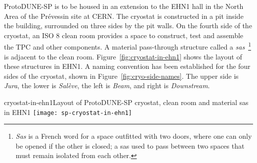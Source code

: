 
\label{ch:spacereq}

ProtoDUNE-SP is to be housed in an extension to the EHN1 hall in the North Area of the Pr\'{e}vessin site at CERN. 
The cryostat is constructed in a pit inside the building, surrounded on three sides by the pit walls.  On the fourth side of the cryostat, an ISO 8 clean room provides a space to construct, test and assemble the TPC and other components. 
A material pass-through structure called a \textit{sas}~\footnote{\textit{Sas} is a French word for a space outfitted with two doors, where one can only be opened if the other is closed; a sas used to pass between two spaces that must remain isolated from each other.} is adjacent to the clean room. Figure~\ref{fig:cryostat-in-ehn1} shows the layout of these structures in EHN1. A naming convention has been established for the four sides of the cryostat, shown in Figure~\ref{fig:cryo-side-names}.  The upper side is \textit{Jura}, the lower is \textit{Sal\`{e}ve}, the left is \textit{Beam}, and right is \textit{Downstream}.



\begin{cdrfigure}{cryostat-in-ehn1}{Layout of ProtoDUNE-SP cryostat, clean room and material sas in EHN1}
\texttt{[image: sp-cryostat-in-ehn1]}
\end{cdrfigure}


